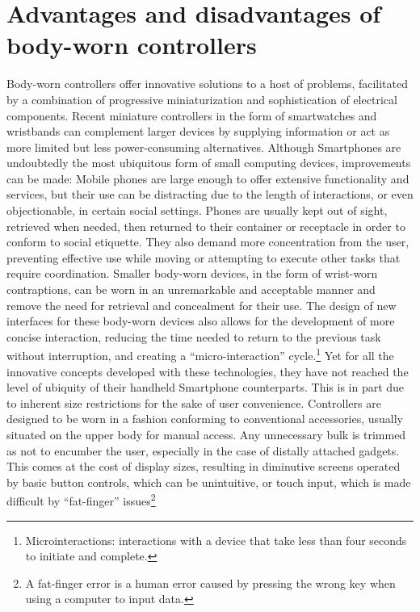 \documentclass{sigchi}
\begin{document}
\section{Advantages and disadvantages of body-worn controllers}
Body-worn controllers offer innovative solutions to a host of problems, facilitated by a combination of progressive miniaturization and sophistication of electrical components. Recent miniature controllers in the form of smartwatches and wristbands can complement larger devices by supplying information or act as more limited but less power-consuming alternatives. \cite{motion-ui} Although Smartphones are undoubtedly the most ubiquitous form of small computing devices, improvements can be made: Mobile phones are large enough to offer extensive functionality and services, but their use can be distracting due to the length of interactions, or even objectionable, in certain social settings. Phones are usually kept out of sight, retrieved when needed, then returned to their container or receptacle in order to conform to social etiquette. They also demand more concentration from the user, preventing effective use while moving or attempting to execute other tasks that require coordination. Smaller body-worn devices, in the form of wrist-worn contraptions, can be worn in an unremarkable and acceptable manner and remove the need for retrieval and concealment for their use. The design of new interfaces for these body-worn devices also allows for the development of more concise interaction, reducing the time needed to return to the previous task without interruption, and creating a ``micro-interaction'' cycle.\footnote{Microinteractions: interactions with a device that take less than four seconds to initiate and complete.} \cite{microinteraction}
Yet for all the innovative concepts developed with these technologies, they have not reached the level of ubiquity of their handheld Smartphone counterparts.
This is in part due to inherent size restrictions for the sake of user convenience. Controllers are designed to be worn in a fashion conforming to conventional accessories, usually situated on the upper body for manual access. Any unnecessary bulk is trimmed as not to encumber the user, especially in the case of distally attached gadgets. This comes at the cost of display sizes, resulting in diminutive screens operated by basic button controls, which can be unintuitive, or touch input, which is made difficult by ``fat-finger'' issues\footnote{A fat-finger error is a human error caused by pressing the wrong key when using a computer to input data.} %
\end{document}
